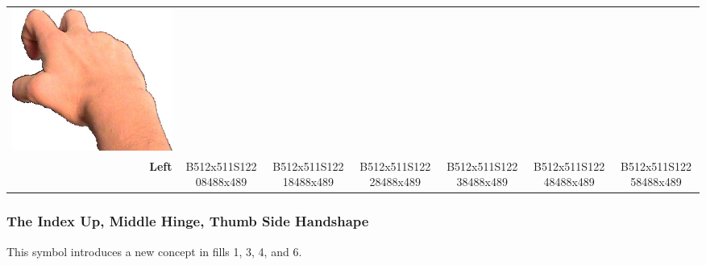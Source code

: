 \documentclass{article}
\begin{document}
\begin{center}
\begin{tabular}{r*{6}{c}}
\includegraphics[scale=0.1]{images/03-03-6.jpg}\\
\textbf{Left}&
B512x511S12208488x489&
B512x511S12218488x489&
B512x511S12228488x489&
B512x511S12238488x489&
B512x511S12248488x489&
B512x511S12258488x489\\
\end{tabular}
\end{center}

\subsubsection{The Index Up, Middle Hinge, Thumb Side Handshape}

This symbol introduces a new concept in fills 1, 3, 4, and 6.
\end{document}
